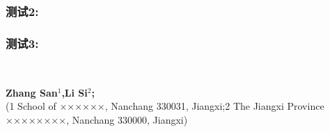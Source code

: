 \documentclass[a4paper,onecolumn,twosize]{article}
\begin{document}
\subsubsection{测试2:}
\subsubsection{测试3:}
  \renewcommand\refname{参考文献}
  
  \liuhao{
  
   
  \setlength{\itemsep}{- 2mm}
}

\newpage

\begin{center}
  \parbox{\textwidth}{
    \vspace{25pt}
    \begin{center}
      {}\\
      \vspace{-0.0cm}
    \end{center}
    \begin{center}
      {\wuhao\textbf{Zhang San$^1$,Li Si$^2$;}}\\[2pt]
      {\liuhao(1 School of ××××××, Nanchang 330031, Jiangxi;2 The
      Jiangxi Province ××××××××, Nanchang 330000, Jiangxi)}\\[2pt]
    \end{center}
    {}
  }
\end{center}
\end{document}
